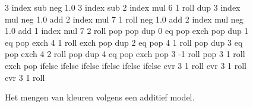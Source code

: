 \begin{figure}
{{   3 index sub neg %
   1.0 3 index sub %
   2 index mul %
   6 1 roll %
   dup 3 index mul neg 1.0 add %
   2 index mul %
   7 1 roll %
   neg 1.0 add %
   2 index mul neg 1.0  add %
   1 index mul %
   7 2 roll %
   pop pop %
   dup 0 eq %
   { %
   pop exch pop
   }
   { dup 1 eq %
     { %
   pop exch 4 1 roll exch pop
     }
     { dup 2 eq %
       { %
       pop 4 1 roll pop
       }
       { dup 3 eq %
         { %
         pop exch 4 2 roll pop
         }
         { dup 4 eq %
           { %
           pop exch pop 3 -1 roll
           }
           { %
           pop 3 1 roll exch pop
           }
           ifelse
         }
         ifelse %
       }
       ifelse %
     }
     ifelse %
   }
   ifelse %
 }
 ifelse %
 cvr 3 1 roll cvr 3 1 roll cvr 3 1 roll 
}

  \centering
  \caption{Het mengen van kleuren volgens een additief model.}
  \label{fig:fw-kleur}
\end{figure}
